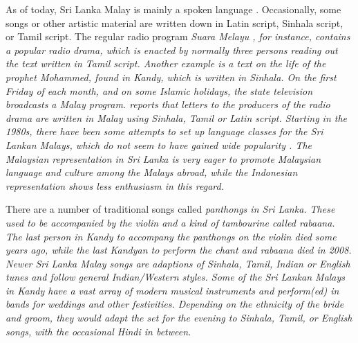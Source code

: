 
As of today, Sri Lanka Malay is mainly a spoken language \citep[cf.][134]{Hussainmiya1990}. Occasionally, some songs or other artistic material are written down in Latin script, Sinhala script, or Tamil script. The regular radio program \em Suara Melayu \em  \citep[established 1957,][28]{Saldin2001}, for instance, contains a popular radio drama, which is enacted by normally three persons reading out the text written in Tamil script. Another example is a text on the life of the prophet Mohammed, found in Kandy, which is written in Sinhala.  On the first Friday of each month, and on some Islamic holidays, the state television broadcasts a Malay program. \citet[47]{Bichsel} reports that letters to the producers of the radio drama are written in Malay using Sinhala, Tamil or Latin script. Starting in  the 1980s, there have been some attempts to set up language classes for the Sri Lankan Malays, which do not seem to have gained wide popularity \citep[39ff]{Saldin2001}. The Malaysian representation in Sri Lanka is very eager to promote Malaysian language and culture among the Malays abroad, while the Indonesian representation shows less enthusiasm in this regard.

There are a number of traditional songs called \em panthongs \em in Sri Lanka.  These used to be accompanied by the violin and  a kind of tambourine called \em rabaana\em. The last person in Kandy to accompany the \em panthongs \em on the violin died some years ago, while the last Kandyan to perform the chant and rabaana died in 2008. Newer Sri Lanka Malay songs are adaptions of Sinhala, Tamil, Indian or English tunes and follow general Indian/Western styles. Some of the Sri Lankan Malays in Kandy have a vast array of modern musical instruments and perform(ed) in bands for weddings and other festivities. Depending on the ethnicity of the bride and groom, they would adapt the set for the evening to Sinhala, Tamil, or English songs, with the occasional Hindi in between.
 
